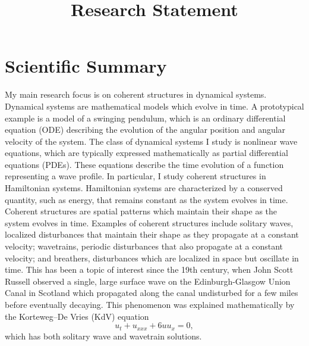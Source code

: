 \documentclass[12pt,reqno,oneside,hidelinks]{article}
\title{Research Statement}
\date{\vspace{-12ex}}
\begin{document}
\thispagestyle{empty}

\section*{Scientific Summary}

My main research focus is on coherent structures in dynamical systems. Dynamical systems are mathematical models which evolve in time. A prototypical example is a model of a swinging pendulum, which is an ordinary differential equation (ODE) describing the evolution of the angular position and angular velocity of the system. The class of dynamical systems I study is nonlinear wave equations, which are typically expressed mathematically as partial differential equations (PDEs). These equations describe the time evolution of a function representing a wave profile. In particular, I study coherent structures in Hamiltonian systems. 
Hamiltonian systems are characterized by a conserved quantity, such as energy, that remains constant as the system evolves in time. Coherent structures are spatial patterns which maintain their shape as the system evolves in time. Examples of coherent structures include solitary waves, localized disturbances that maintain their shape as they propagate at a constant velocity; wavetrains, periodic disturbances that also propagate at a constant velocity; and breathers, disturbances which are localized in space but oscillate in time. This has been a topic of interest since the 19th century, when John Scott Russell observed a single, large surface wave on the Edinburgh-Glasgow Union Canal in Scotland which propagated along the canal undisturbed for a few miles before eventually decaying. This phenomenon was explained mathematically by the Korteweg–De Vries (KdV) equation 
\[
u_t + u_{xxx} + 6 u u_x = 0,
\]
which has both solitary wave and wavetrain solutions.
\end{document}
